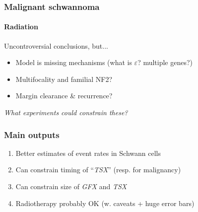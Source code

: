 \documentclass{beamer}
\begin{document}
\begin{frame}
    \frametitle{Malignant schwannoma}
    \framesubtitle{Radiation}
    Uncontroversial conclusions, but...

    \begin{itemize}
        \item Model is missing mechanisms (what is $\varepsilon$? multiple genes?)
        \item Multifocality and familial NF2?
        \item Margin clearance \& recurrence?
    \end{itemize}
        \begin{center}
            \emph{What experiments could constrain these?}
        \end{center}
\end{frame}

%

\begin{frame}
    \frametitle{Main outputs}
    \begin{enumerate}
        \item Better estimates of event rates in Schwann cells
        \item Can constrain timing of ``\emph{TSX}'' (resp. for malignancy)
        \item Can constrain size of \emph{GFX} and \emph{TSX}
        \item Radiotherapy probably OK (w. caveats + huge error bars)
    \end{enumerate}
\end{frame}
\end{document}
